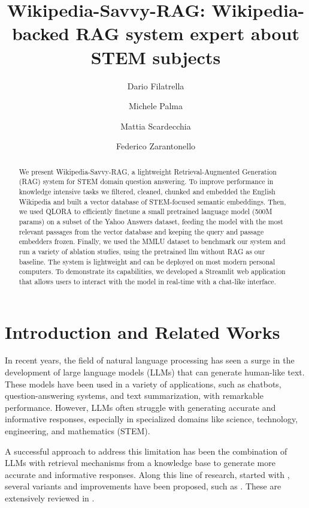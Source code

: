 \documentclass[11pt]{article}
\title{Wikipedia-Savvy-RAG: Wikipedia-backed RAG system expert about STEM subjects}
\author{Dario Filatrella \and Michele Palma \and Mattia Scardecchia \and Federico Zarantonello}
\begin{document}
\maketitle
\begin{abstract}
We present Wikipedia-Savvy-RAG, a lightweight Retrieval-Augmented Generation (RAG) system for
STEM domain question answering. To improve performance in knowledge intensive tasks we filtered, cleaned, 
chunked and embedded the English Wikipedia and built a vector database of STEM-focused semantic embeddings. 
Then, we used QLORA to efficiently finetune a small pretrained language model 
(500M params) on a subset of the Yahoo Answers dataset, feeding the model with the most relevant passages from the 
vector database and keeping the query and passage embedders frozen. Finally, we used the MMLU dataset to 
benchmark our system and run a variety of ablation studies, using the pretrained llm without RAG as our baseline.
The system is lightweight and can be deployed on most modern personal computers. To demonstrate its capabilities,
we developed a Streamlit web application that allows users to interact with the model in real-time with a chat-like interface.

\end{abstract}

\section{Introduction and Related Works}

In recent years, the field of natural language processing has seen a surge in
the development of large language models (LLMs) that can generate human-like text. \cite{gpt3}
These models have been used in a variety of applications, such as chatbots,
question-answering systems, and text summarization, with remarkable performance.  \cite{nlp_applications}
However, LLMs often struggle with generating accurate and informative responses, especially in specialized
domains like science, technology, engineering, and mathematics (STEM).  \cite{something_about_allucinations}

A successful approach to address this limitation has been the combination of LLMs with retrieval
mechanisms from a knowledge base to generate more accurate and informative responses.
Along this line of research, started with \cite{rag}, several variants and improvements have been proposed,
such as \cite{replug} \cite{at_least_one_more}. These are extensively reviewed in \cite{rag_review}.
\end{document}
